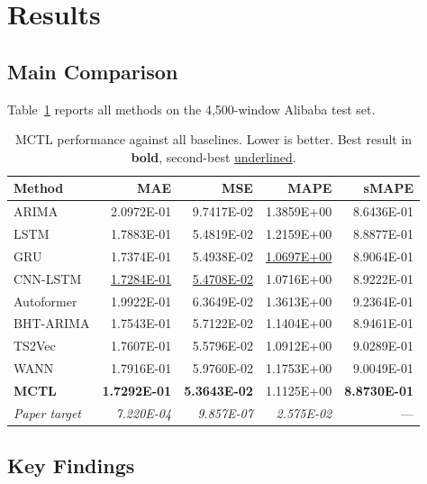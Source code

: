 \documentclass[12pt,a4paper]{article}
\begin{document}
\section{Results}

\subsection{Main Comparison}

Table~\ref{tab:results} reports all methods on the 4,500-window Alibaba test set.

\begin{table}[H]
\centering
\caption{MCTL performance against all baselines.  Lower is better.
Best result in \textbf{bold}, second-best \underline{underlined}.}
\label{tab:results}
\small
\begin{tabular}{@{}lrrrr@{}}
\toprule
\textbf{Method} & \textbf{MAE} & \textbf{MSE} & \textbf{MAPE} & \textbf{sMAPE} \\
\midrule
ARIMA           & 2.0972E-01 & 9.7417E-02 & 1.3859E+00 & 8.6436E-01 \\
LSTM            & 1.7883E-01 & 5.4819E-02 & 1.2159E+00 & 8.8877E-01 \\
GRU             & 1.7374E-01 & 5.4938E-02 & \underline{1.0697E+00} & 8.9064E-01 \\
CNN-LSTM        & \underline{1.7284E-01} & \underline{5.4708E-02} & 1.0716E+00 & 8.9222E-01 \\
Autoformer      & 1.9922E-01 & 6.3649E-02 & 1.3613E+00 & 9.2364E-01 \\
BHT-ARIMA       & 1.7543E-01 & 5.7122E-02 & 1.1404E+00 & 8.9461E-01 \\
TS2Vec          & 1.7607E-01 & 5.5796E-02 & 1.0912E+00 & 9.0289E-01 \\
WANN            & 1.7916E-01 & 5.9760E-02 & 1.1753E+00 & 9.0049E-01 \\
\midrule
\textbf{MCTL}   & \textbf{1.7292E-01} & \textbf{5.3643E-02} & 1.1125E+00 & \textbf{8.8730E-01} \\
\midrule[\heavyrulewidth]
\textit{Paper target} & \textit{7.220E-04} & \textit{9.857E-07} & \textit{2.575E-02} & --- \\
\bottomrule
\end{tabular}
\end{table}

\subsection{Key Findings}
\end{document}
